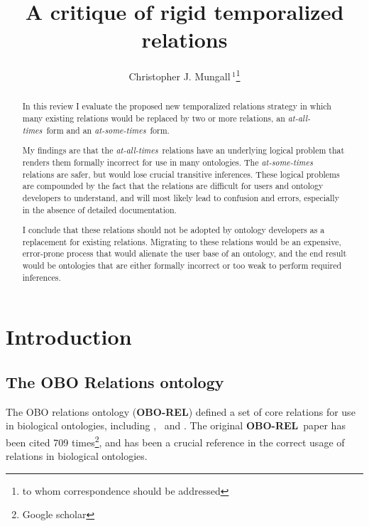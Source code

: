 \documentclass{bioinfo}
\def\partOf{\pr{part\_of}}
\def\isA{\pr{is\_a}}
\def\derivesFrom{\pr{derives\_from}}
\def\OBOREL{\textbf{OBO-REL}}
\begin{document}

\title{A critique of rigid temporalized relations}

\author{Christopher J. Mungall\,$^{1}$\footnote{to whom correspondence should be addressed}}
\address{$^{1}$Genomics Division, Lawrence Berkeley National Laboratory, MS84R017, 1 Cyclotron Road, Berkeley, CA 94720 USA}

\history{}

\editor{}

\maketitle

\begin{abstract}

  In this review I evaluate the proposed new temporalized relations
  strategy in which many existing relations would be replaced by two
  or more relations, an \emph{at-all-times}\ form and an
  \emph{at-some-times}\ form.

  My findings are that the \emph{at-all-times}\ relations have an
  underlying logical problem that renders them formally incorrect for
  use in many ontologies. The \emph{at-some-times} relations are
  safer, but would lose crucial transitive inferences. These logical
  problems are compounded by the fact that the relations are difficult
  for users and ontology developers to understand, and will most
  likely lead to confusion and errors, especially in the absence of
  detailed documentation.

  I conclude that these relations should not be adopted by ontology
  developers as a replacement for existing relations. Migrating to
  these relations would be an expensive, error-prone process that
  would alienate the user base of an ontology, and the end result
  would be ontologies that are either formally incorrect or too weak
  to perform required inferences.

\end{abstract}

\section{Introduction}

\subsection{The OBO Relations ontology}


The OBO relations ontology (\OBOREL) defined a set of core relations
for use in biological ontologies, including \isA, \partOf\ and
\derivesFrom\cite{Smith2005}. The original \OBOREL\ paper has been
cited 709 times\footnote{Google scholar}, and has been a crucial
reference in the correct usage of relations in biological ontologies.
\end{document}
